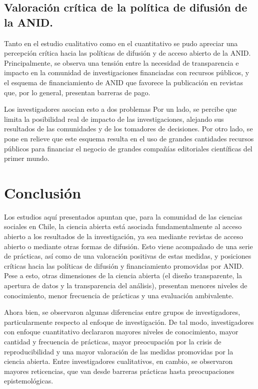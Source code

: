 \documentclass[
  letterpaper,
  DIV=11,
  numbers=noendperiod]{scrreprt}
\begin{document}
\hypertarget{valoraciuxf3n-cruxedtica-de-la-poluxedtica-de-difusiuxf3n-de-la-anid.}{%
\section{Valoración crítica de la política de difusión de la
ANID.}\label{valoraciuxf3n-cruxedtica-de-la-poluxedtica-de-difusiuxf3n-de-la-anid.}}

Tanto en el estudio cualitativo como en el cuantitativo se pudo apreciar
una percepción crítica hacia las políticas de difusión y de acceso
abierto de la ANID. Principalmente, se observa una tensión entre la
necesidad de transparencia e impacto en la comunidad de investigaciones
financiadas con recursos públicos, y el esquema de financiamiento de
ANID que favorece la publicación en revistas que, por lo general,
presentan barreras de pago.

Los investigadores asocian esto a dos problemas Por un lado, se percibe
que limita la posibilidad real de impacto de las investigaciones,
alejando sus resultados de las comunidades y de los tomadores de
decisiones. Por otro lado, se pone en relieve que este esquema resulta
en el uso de grandes cantidades recursos públicos para financiar el
negocio de grandes compañías editoriales científicas del primer mundo.

\hypertarget{conclusiuxf3n}{%
\chapter{Conclusión}\label{conclusiuxf3n}}

Los estudios aquí presentados apuntan que, para la comunidad de las
ciencias sociales en Chile, la ciencia abierta está asociada
fundamentalmente al acceso abierto a los resultados de la investigación,
ya sea mediante revistas de acceso abierto o mediante otras formas de
difusión. Esto viene acompañado de una serie de prácticas, así como de
una valoración positivas de estas medidas, y posiciones críticas hacia
las políticas de difusión y financiamiento promovidas por ANID. Pese a
esto, otras dimensiones de la ciencia abierta (el diseño transparente,
la apertura de datos y la transparencia del análisis), presentan menores
niveles de conocimiento, menor frecuencia de prácticas y una evaluación
ambivalente.

Ahora bien, se observaron algunas diferencias entre grupos de
investigadores, particularmente respecto al enfoque de investigación. De
tal modo, investigadores con enfoque cuantitativo declararon mayores
niveles de conocimiento, mayor cantidad y frecuencia de prácticas, mayor
preocupación por la crisis de reproducibilidad y una mayor valoración de
las medidas promovidas por la ciencia abierta. Entre investigadores
cualitativos, en cambio, se observaron mayores reticencias, que van
desde barreras prácticas hasta preocupaciones epistemológicas.
\end{document}
